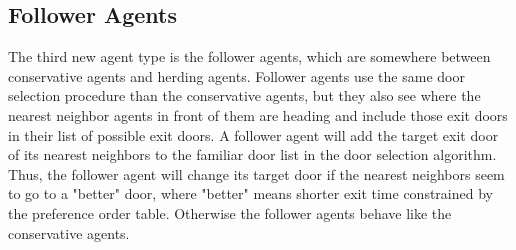 \documentclass[12pt,a4paper,final,twoside]{stylevk}
\begin{document}
\subsection{Follower Agents}\label{Sec_FollowerAgents}

\noindent The third new agent type is the follower agents, which are
somewhere between conservative agents and herding agents.  Follower
agents use the same door selection procedure than the conservative
agents, but they also see where the nearest neighbor agents in front
of them are heading and include those exit doors in their list of
possible exit doors.  A follower agent will add the target exit door
of its nearest neighbors to the familiar door list in the door
selection algorithm.  Thus, the follower agent will change its target
door if the nearest neighbors seem to go to a "better" door, where
"better" means shorter exit time constrained by the preference order
table.  Otherwise the follower agents behave like the conservative
agents.




\end{document}
